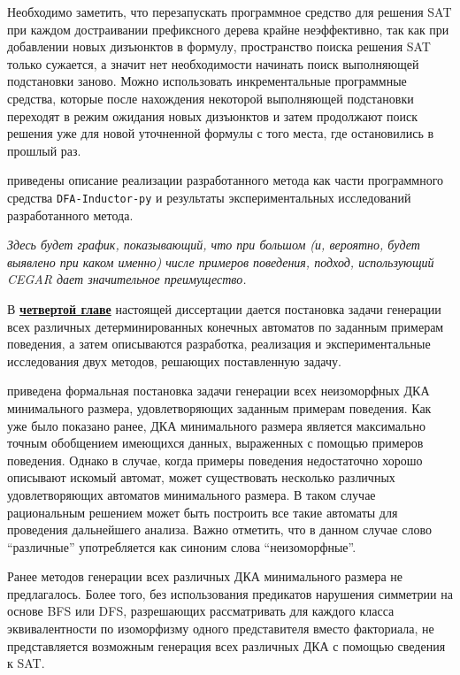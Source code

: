 Необходимо заметить, что перезапускать программное средство для решения SAT при каждом достраивании префиксного дерева крайне неэффективно, так как при добавлении новых дизъюнктов в формулу, пространство поиска решения SAT только сужается, а значит нет необходимости начинать поиск выполняющей подстановки заново.
Можно использовать инкрементальные программные средства, которые после нахождения некоторой выполняющей подстановки переходят в режим ожидания новых дизъюнктов и затем продолжают поиск решения уже для новой уточненной формулы с того места, где остановились в прошлый раз.

\insection{\ref{sec:cegar:results}} приведены описание реализации разработанного метода как части программного средства \texttt{DFA-Inductor-py} и результаты экспериментальных исследований разработанного метода. 

\emph{Здесь будет график, показывающий, что при большом (и, вероятно, будет выявлено при каком именно) числе примеров поведения, подход, использующий CEGAR дает значительное преимущество.}


В \textbf{\underline{четвертой главе}} настоящей диссертации дается постановка задачи генерации всех различных детерминированных конечных автоматов по заданным примерам поведения, а затем описываются разработка, реализация и экспериментальные исследования двух методов, решающих поставленную задачу. 

\insection{\ref{sec:findall:problem}} приведена формальная постановка задачи генерации всех неизоморфных ДКА минимального размера, удовлетворяющих заданным примерам поведения.
Как уже было показано ранее, ДКА минимального размера является максимально точным обобщением имеющихся данных, выраженных с помощью примеров поведения.
Однако в случае, когда примеры поведения недостаточно хорошо описывают искомый автомат, может существовать несколько различных удовлетворяющих автоматов минимального размера.
В таком случае рациональным решением может быть построить все такие автоматы для проведения дальнейшего анализа.
Важно отметить, что в данном случае слово ``различные'' употребляется как синоним слова ``неизоморфные''.

Ранее методов генерации всех различных ДКА минимального размера не предлагалось. 
Более того, без использования предикатов нарушения симметрии на основе BFS или DFS, разрешающих рассматривать для каждого класса эквивалентности по изоморфизму одного представителя вместо факториала, не представляется возможным генерация всех различных ДКА с помощью сведения к SAT.

